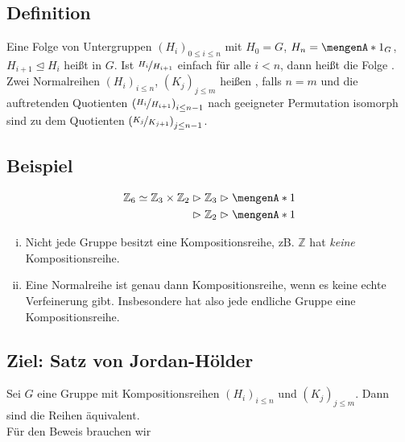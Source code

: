 \subsection[Definition: Normalreihe und Kompositionsreihe]{Definition} %
\label{sub:111}
Eine Folge von Untergruppen $(H_i)_{0 \le i \le n}$ mit $H_0 = G$, $H_n = \set{1_G} $, $H_{i+1} \unlhd H_i$ heißt  in $G$. Ist $\nicefrac{H_i}{H_{i+1}}$
einfach für alle $i < n$, dann heißt die Folge . Zwei Normalreihen $(H_i)_{i \le n}$, $(K_j)_{j \le m}$ heißen , falls $n=m$
und die auftretenden Quotienten $\enbrace*{\nicefrac{H_i}{H_{i+1}}}_{i \le n-1} $  nach geeigneter Permutation isomorph sind zu dem Quotienten 
$\enbrace*{\nicefrac{K_j}{K_{j+1}}}_{j \le n-1} $.

\subsection[Beispiel zu Normalreihen]{Beispiel} %
\label{sub:112}
\begin{align*}
	\mathds{Z}_6 \simeq \mathds{Z}_3 \times \mathds{Z}_2 &\vartriangleright \mathds{Z}_3 \vartriangleright \set{1} \\
	&\vartriangleright \mathds{Z}_2 \vartriangleright \set{1}  
\end{align*}
\begin{enumerate}[(i)]
	\item Nicht jede Gruppe besitzt eine Kompositionsreihe, zB. $\mathds{Z}$ hat \emph{keine} Kompositionsreihe.
	\item Eine Normalreihe ist genau dann Kompositionsreihe, wenn es keine echte Verfeinerung gibt. Insbesondere hat also jede endliche Gruppe eine Kompositionsreihe.
\end{enumerate}

\subsection{Ziel: Satz von Jordan-Hölder} %
\label{sub:113}
Sei $G$ eine Gruppe mit Kompositionsreihen $(H_i)_{i \le n}$ und $(K_j)_{j \le m}$. Dann sind die Reihen äquivalent.
\bigskip\\
Für den Beweis brauchen wir

